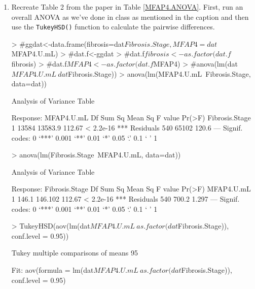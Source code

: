 \documentclass{article}
\begin{document}
\begin{enumerate}
\newpage
\item Recreate Table 2 from the paper in Table \ref{MFAP4.ANOVA}. First, run an overall ANOVA as we've 
  done in class as mentioned in the caption and then use the \texttt{TukeyHSD()} 
  function to calculate the pairwise differences.
\begin{Schunk}
\begin{Sinput}
> #ggdat<-data.frame(fibrosis=dat$Fibrosis.Stage, MFAP4=dat$MFAP4.U.mL)
> #dat.f<-ggdat
> #dat.f$fibrosis<-as.factor(dat.f$fibrosis)
> #dat.f$MFAP4<-as.factor(dat.f$MFAP4)
> #anova(lm(dat$MFAP4.U.mL~dat$Fibrosis.Stage))
> anova(lm(MFAP4.U.mL~Fibrosis.Stage, data=dat))
\end{Sinput}
\begin{Soutput}
Analysis of Variance Table

Response: MFAP4.U.mL
                Df Sum Sq Mean Sq F value    Pr(>F)    
Fibrosis.Stage   1  13584 13583.9  112.67 < 2.2e-16 ***
Residuals      540  65102   120.6                      
---
Signif. codes:  0 ‘***’ 0.001 ‘**’ 0.01 ‘*’ 0.05 ‘.’ 0.1 ‘ ’ 1
\end{Soutput}
\begin{Sinput}
> anova(lm(Fibrosis.Stage~MFAP4.U.mL, data=dat))
\end{Sinput}
\begin{Soutput}
Analysis of Variance Table

Response: Fibrosis.Stage
            Df Sum Sq Mean Sq F value    Pr(>F)    
MFAP4.U.mL   1  146.1 146.102  112.67 < 2.2e-16 ***
Residuals  540  700.2   1.297                      
---
Signif. codes:  0 ‘***’ 0.001 ‘**’ 0.01 ‘*’ 0.05 ‘.’ 0.1 ‘ ’ 1
\end{Soutput}
\begin{Sinput}
> TukeyHSD(aov(lm(dat$MFAP4.U.mL~as.factor(dat$Fibrosis.Stage)), conf.level = 0.95))
\end{Sinput}
\begin{Soutput}
  Tukey multiple comparisons of means
    95%

Fit: aov(formula = lm(dat$MFAP4.U.mL ~ as.factor(dat$Fibrosis.Stage)), conf.level = 0.95)


\end{Soutput}
\end{Schunk}
\end{enumerate}
\end{document}
